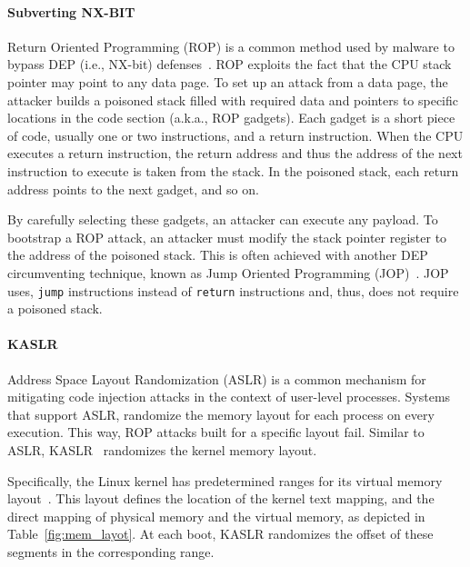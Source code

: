 \paragraph{Subverting NX-BIT}

Return Oriented Programming (ROP) is a common method used by malware to bypass DEP (i.e., NX-bit) defenses~\cite{RBSS12}. ROP exploits the fact that the CPU stack pointer may point to any data page. To set up an attack from a data page, the attacker builds a poisoned stack filled with required data and pointers to specific locations in the code section (a.k.a., ROP gadgets). Each gadget is a short piece of code, usually one or two instructions, and a return instruction. When the CPU executes a return instruction, the return address and thus the address of the next instruction to execute is taken from the stack. In the poisoned stack, each return address points to the next gadget, and so on. 
 
By carefully selecting these gadgets, an attacker can execute any payload. To bootstrap a ROP attack, an attacker must modify the stack pointer register to the address of the poisoned stack. This is often achieved with another DEP circumventing technique, known as Jump Oriented Programming (JOP)~\cite{BJFL11}. JOP uses, \texttt{jump} instructions instead of \texttt{return} instructions and, thus, does not require a poisoned stack.

\paragraph{KASLR}\label{sec:kaslr}

Address Space Layout Randomization (ASLR) is a common mechanism for mitigating code injection attacks in the context of user-level processes. Systems that support ASLR, randomize the memory layout for each process on every execution. This way, ROP attacks built for a specific layout fail. Similar to ASLR, KASLR~\cite{kalsr} randomizes the kernel memory layout.

Specifically, the Linux kernel has predetermined ranges for its virtual memory layout~\cite{mem_layout}. This layout defines the location of the kernel text mapping, and the direct mapping of physical memory and the virtual memory, as depicted in Table~\ref{fig:mem_layot}. At each boot, KASLR randomizes the offset of these segments in the corresponding range.


